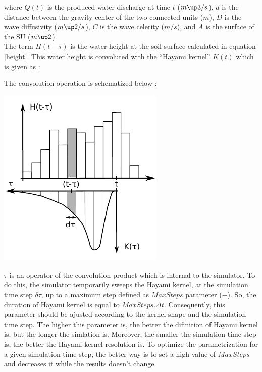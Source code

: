 

where $Q(t)$ is the produced water discharge at time $t$ ($m\up3/s$), $d$ is the distance between the gravity center of the two connected units ($m$), $D$ is the wave diffusivity ($m\up2/s$), $C$ is the wave celerity ($m/s$), and $A$ is the surface of the SU ($m\up2$).\\

The term $H(t-\tau)$ is the water height at the soil surface calculated in equation \ref{height}. This water height is convoluted with the ``Hayami kernel'' $K(t)$ which is given as :



The convolution operation is schematized below :

\includegraphics[width=8cm]{doc/common/Convolution_HayamiSU.pdf}

$\tau$ is an operator of the convolution product which is internal to the simulator. To do this, the simulator temporarily sweeps the Hayami kernel, at the simulation time step $\delta \tau$, up to a maximum step defined as $MaxSteps$ parameter ($-$). So, the duration of Hayami kernel is equal to $MaxSteps.\Delta t$. Consequently, this parameter should be ajusted according to the kernel shape and the simulation time step. The higher this parameter is, the better the difinition of Hayami kernel is, but the longer the simlation is. Moreover, the smaller the simulation time step is, the better the Hayami kernel resolution is. To optimize the parametrization for a given simulation time step, the better way is to set a high value of $MaxSteps$ and decreases it while the results doesn't change.\\


